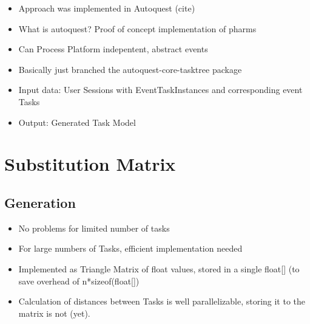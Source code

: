 \begin{itemize}
	\item Approach was implemented in Autoquest (cite)
	\item What is autoquest? Proof of concept implementation of pharms
	\item Can Process Platform indepentent, abstract events
	\item Basically just branched the autoquest-core-tasktree package
	\item Input data: User Sessions with EventTaskInstances and corresponding event Tasks
	\item Output: Generated Task Model
\end{itemize}
\section{Substitution Matrix}
\subsection{Generation}
\begin{itemize}
	\item No problems for limited number of tasks
	\item For large numbers of Tasks, efficient implementation needed
	\item Implemented as Triangle Matrix of float values, stored in a single float[] (to save overhead of n*sizeof(float[])
	\item Calculation of distances between Tasks is well parallelizable, storing it to the matrix is not (yet).
\end{itemize}
